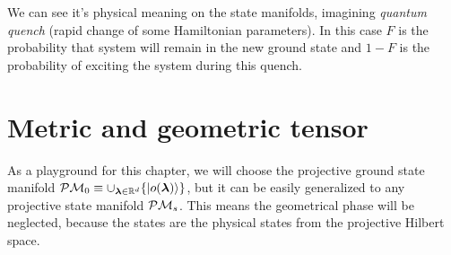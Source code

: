 We can see it's physical meaning on the state manifolds, imagining \emph{quantum quench} (rapid change of some Hamiltonian parameters). In this case $F$ is the probability that system will remain in the new ground state and $1-F$ is the probability of exciting the system during this quench.






\section{Metric and geometric tensor}
As a playground for this chapter, we will choose the projective ground state manifold $\mathcal{P}\mathcal{M}_0\equiv \cup_{{\bm\lambda}\in\mathbb{R}^d} \{\ket{o({\bm\lambda})}\}$, but it can be easily generalized to any projective state manifold $\mathcal{P}\mathcal{M}_s$. This means the geometrical phase will be neglected, because the states are the physical states from the projective Hilbert space.

